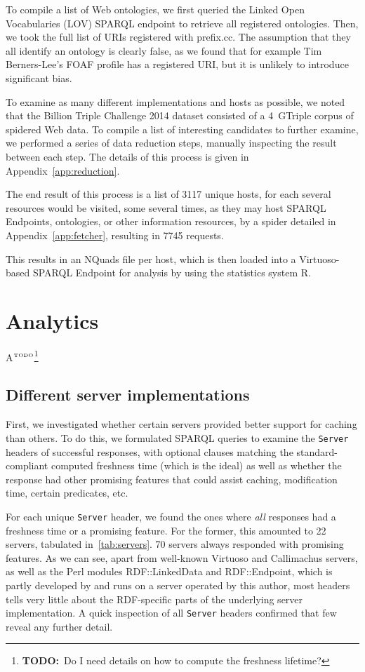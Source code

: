 \documentclass{llncs}
\newcommand{\httph}[1]{\texttt{#1}}
\newcommand{\todo}[1]{\ensuremath{^{\textrm{\tiny{TODO}\normalsize}}}\footnote{\textbf{TODO:}~#1}}
\begin{document}
To compile a list of Web ontologies, we first queried the Linked Open
Vocabularies (LOV) \cite{lov2} SPARQL endpoint
to retrieve all registered ontologies. Then, we took the full list of
URIs registered with prefix.cc. The assumption that they all identify
an ontology is clearly false, as we found that for example Tim
Berners-Lee's FOAF profile has a registered URI, but it is unlikely to
introduce significant bias.

To examine as many different implementations and hosts as possible, we
noted that the Billion Triple Challenge 2014 \cite{btc-2014} dataset
consisted of a 4~GTriple corpus of spidered Web data. To compile a
list of interesting candidates to further examine, we performed a
series of data reduction steps, manually inspecting the result between
each step. The details of this process is given in
Appendix~\ref{app:reduction}.

The end result of this process is a list of 3117 unique hosts, for
each several resources would be visited, some several times, as they
may host SPARQL Endpoints, ontologies, or other information resources,
by a spider detailed in Appendix~\ref{app:fetcher}, resulting in 7745
requests.

This results in an NQuads file per host, which is then loaded into a
Virtuoso-based SPARQL Endpoint for analysis by using the statistics
system R\cite{kn:r}.

\section{Analytics}

A\todo{Do I need details on how to compute the freshness lifetime?}

\subsection{Different server implementations}

First, we investigated whether certain servers provided better support
for caching than others. To do this, we formulated SPARQL queries to
examine the \httph{Server} headers of successful responses, with
optional clauses matching the standard-compliant computed freshness
time (which is the ideal) as well as whether the response had other
promising features that could assist caching, modification time,
certain predicates, etc.

For each unique \httph{Server} header, we found the ones where
\emph{all} responses had a freshness time or a promising feature. For
the former, this amounted to 22 servers, tabulated
in~\ref{tab:servers}. 70 servers always responded with promising
features. As we can see, apart from well-known Virtuoso and
Callimachus servers, as well as the Perl modules RDF::LinkedData and
RDF::Endpoint, which is partly developed by and runs on a server
operated by this author, most headers tells very little about the
RDF-specific parts of the underlying server implementation. A quick
inspection of all \httph{Server} headers confirmed that few reveal any
further detail.
\end{document}

